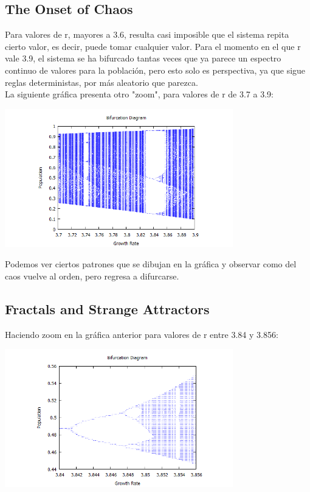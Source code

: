 \documentclass[12pt]{article}
\begin{document}
\subsection{The Onset of Chaos}

Para valores de r, mayores a 3.6, resulta casi imposible que el sistema repita cierto valor, es decir, puede tomar cualquier valor. Para el momento en el que r vale 3.9, el sistema se ha bifurcado tantas veces que ya parece un espectro continuo de valores para la población, pero esto solo es perspectiva, ya que sigue reglas deterministas, por más aleatorio que parezca.\\

La siguiente gráfica presenta otro "zoom", para valores de r de 3.7 a 3.9:

\begin{center}
 \includegraphics[height=6cm]{4.png}
 \end{center}

Podemos ver ciertos patrones que se dibujan en la gráfica y observar como del caos vuelve al orden, pero regresa a difurcarse.

\subsection{Fractals and Strange Attractors}

Haciendo zoom en la gráfica anterior para valores de r entre 3.84 y 3.856: 

\begin{center}
 \includegraphics[height=6cm]{5.png}
 \end{center}
\end{document}

